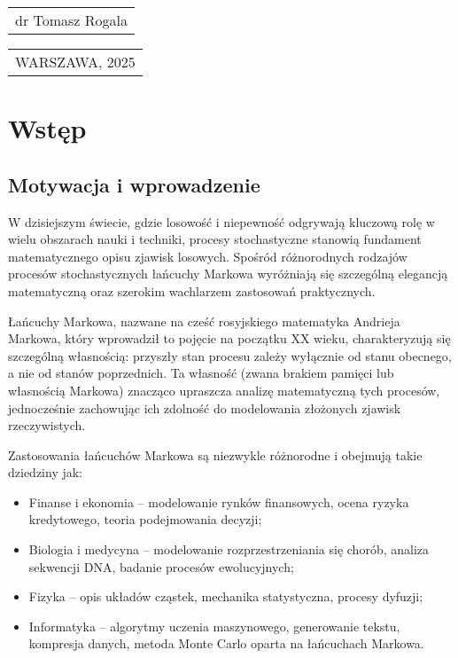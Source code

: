 \documentclass[final,a4paper,openany,12pt]{mwbk}
\begin{document}
\begin{titlepage}
\begin{tabular}{l}
dr Tomasz Rogala
\end{tabular}

\vspace{3.5cm}

{\centering

{\small
\begin{tabular}{c}
{WARSZAWA, 2025}\\
\end{tabular}
}

}

\renewcommand{\arraystretch}{1} %

\end{titlepage}

\chapter{Wstęp}

\section{Motywacja i wprowadzenie}

W dzisiejszym świecie, gdzie losowość i niepewność odgrywają kluczową rolę w wielu obszarach nauki i techniki, procesy stochastyczne stanowią fundament matematycznego opisu zjawisk losowych. Spośród różnorodnych rodzajów procesów stochastycznych łańcuchy Markowa wyróżniają się szczególną elegancją matematyczną oraz szerokim wachlarzem zastosowań praktycznych.

Łańcuchy Markowa, nazwane na cześć rosyjskiego matematyka Andrieja Markowa, który wprowadził to pojęcie na początku XX wieku, charakteryzują się szczególną własnością: przyszły stan procesu zależy wyłącznie od stanu obecnego, a nie od stanów poprzednich. Ta własność (zwana brakiem pamięci lub własnością Markowa) znacząco upraszcza analizę matematyczną tych procesów, jednocześnie zachowując ich zdolność do modelowania złożonych zjawisk rzeczywistych.

Zastosowania łańcuchów Markowa są niezwykle różnorodne i obejmują takie dziedziny jak:
\begin{itemize}
    \item Finanse i ekonomia -- modelowanie rynków finansowych, ocena ryzyka kredytowego, teoria podejmowania decyzji;
    \item Biologia i medycyna -- modelowanie rozprzestrzeniania się chorób, analiza sekwencji DNA, badanie procesów ewolucyjnych;
    \item Fizyka -- opis układów cząstek, mechanika statystyczna, procesy dyfuzji;
    \item Informatyka -- algorytmy uczenia maszynowego, generowanie tekstu, kompresja danych, metoda Monte Carlo oparta na łańcuchach Markowa.
\end{itemize}
\end{document}
